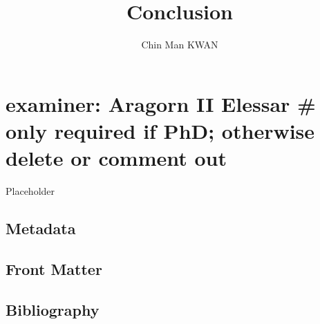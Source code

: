 \documentclass[a4paper, oneside]{report}
\title{Conclusion}
\author{Chin Man KWAN}
\newlength{\frontmatterbaselineskip}
\newlength{\textbaselineskip}
\begin{document}
\maketitle



\tableofcontents

\setlength{\textbaselineskip}{22pt plus2pt}

\setlength{\frontmatterbaselineskip}{17pt plus1pt minus1pt}

\setlength{\parskip}{2pt plus 1pt}

\setlength{\baselineskip}{\textbaselineskip}

\flushbottom

\hypertarget{examiner-aragorn-ii-elessar-only-required-if-phd-otherwise-delete-or-comment-out}{%
\chapter{examiner: Aragorn II Elessar \# only required if PhD; otherwise
delete or comment
out}\label{examiner-aragorn-ii-elessar-only-required-if-phd-otherwise-delete-or-comment-out}}

Placeholder

\hypertarget{metadata}{%
\section{Metadata}\label{metadata}}

\hypertarget{front-matter}{%
\section{Front Matter}\label{front-matter}}

\hypertarget{bibliography}{%
\section{Bibliography}\label{bibliography}}
\end{document}
